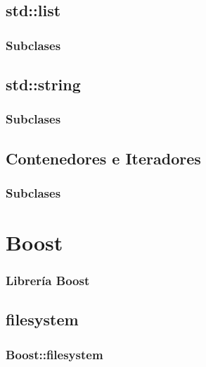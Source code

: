 \documentclass{beamer}
\begin{document}
\subsection{std::list}
\begin{frame}
\frametitle{Subclases}

\end{frame}

\subsection{std::string}
\begin{frame}
\frametitle{Subclases}

\end{frame}

\subsection{Contenedores e Iteradores}
\begin{frame}
\frametitle{Subclases}

\end{frame}

\section{Boost}
\begin{frame}
\frametitle{Librería Boost}

\end{frame}

% 
% 
% 

\subsection{filesystem}
\begin{frame}
\frametitle{Boost::filesystem}

\end{frame}
\end{document}
